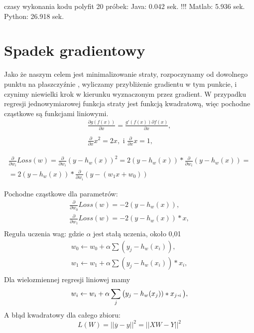 czasy wykonania kodu polyfit 20 próbek: 
Java:    0.042  sek. !!!    
Matlab:  5.936 sek.
Python: 26.918 sek.





\section{Spadek gradientowy} Jako że naszym celem jest minimalizowanie straty, rozpoczynamy od dowolnego punktu na płaszczyźnie \(<w0,w1>\), wyliczamy przybliżenie gradientu w tym punkcie, i czynimy niewielki krok w kierunku wyznaczonym przez gradient. W przypadku regresji jednowymiarowej funkcja straty jest funkcją kwadratową, więc pochodne cząstkowe są funkcjami liniowymi. 
\begin{equation}
\begin{split}
\frac {\partial g ( f(x) )}{\partial x} = \frac {g' ( f(x) ) \partial f(x)}{\partial x},\\
\\
\frac {\partial}{\partial x}x^2=2x, \text{ i }
\frac {\partial}{\partial x}x=1,
\end{split}
\end{equation}

\begin{equation}
\begin{split}
\frac {\partial}{ \partial w_i} Loss(w) = 
\frac {\partial}{ \partial w_i} (y-h_w(x))^2 =2(y-h_w(x)) * \frac{\partial}{\partial w_i}(y-h_w(x)) = \\ = 2(y-h_w(x))*\frac{\partial}{\partial w_i}(y-(w_1x + w_0))
\end{split}
\end{equation}


Pochodne cząstkowe dla parametrów:
\begin{equation}
\begin{split}
\frac {\partial}{ \partial w_0} Loss(w) = -2(y-h_w(x)), \\
\frac {\partial}{ \partial w_1} Loss(w) = -2(y-h_w(x))*x, \\
\end{split}
\end{equation}
Reguła uczenia wag: gdzie \(\alpha\) jest stałą uczenia, około 0,01
\begin{equation}
\begin{split}
w_0 \leftarrow w_0 + \alpha \sum (y_j - h_w(x_i)),\\
w_1 \leftarrow w_1 + \alpha \sum (y_j - h_w(x_i))*x_i,\\
\end{split}
\end{equation}
Dla wielozmiennej regresji liniowej mamy \cite{russell2023} 
\begin{equation}
\begin{split}
w_i \leftarrow w_i + \alpha \sum_{j} \big{(}y_j - h_w(x_j))*x_j,_i\big{)},\\
\end{split}
\end{equation}
A błąd kwadratowy dla całego zbioru: \cite{russell2023} 
\begin{equation}
L(W)=||\overline y-y||^2 = ||XW-Y||^2
\end{equation}
